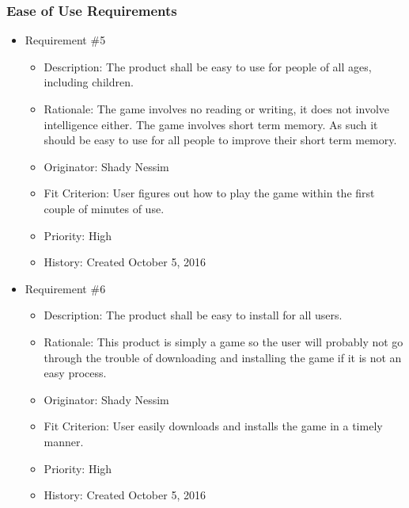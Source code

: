 \documentclass[12pt, titlepage]{article}
\begin{document}
\subsubsection{Ease of Use Requirements}
\begin{itemize}

\item Requirement \#5
\begin{itemize}  
\item Description: The product shall be easy to use for people of all ages, including children. 
\item Rationale: The game involves no reading or writing, it does not involve intelligence either. The game involves short term memory. As such it should be easy to use for all people to improve their short term memory.
\item Originator: Shady Nessim 
\item Fit Criterion: User figures out how to play the game within the first couple of minutes of use. 
\item Priority: High 
\item History: Created October 5, 2016
\end{itemize}

\item Requirement \#6
\begin{itemize}  
\item Description: The product shall be easy to install for all users. 
\item Rationale: This product is simply a game so the user will probably not go through the trouble of downloading and installing the game if it is not an easy process.
\item Originator: Shady Nessim 
\item Fit Criterion: User easily downloads and installs the game in a timely manner. 
\item Priority: High 
\item History: Created October 5, 2016
\end{itemize}

\end{itemize}
\end{document}
